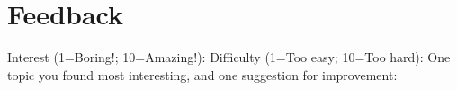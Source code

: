 \section*{Feedback}
\vspace*{-0.18in}
Interest (1=Boring!; 10=Amazing!):
Difficulty (1=Too easy; 10=Too hard):
One topic you found most interesting, and one suggestion for improvement:\\
\eprob
